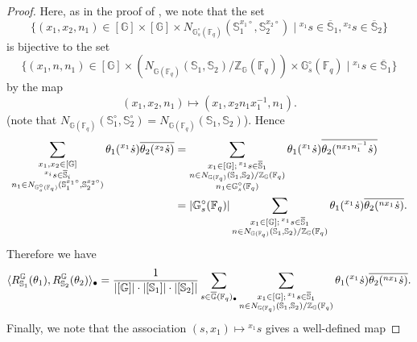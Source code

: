 \documentclass{amsart}
\newcommand{\F}{\mathbb{F}}
\newcommand{\bbS}{\mathbb{S}}
\newcommand{\bbG}{\mathbb{G}}
\newcommand{\bbZ}{\mathbb{Z}}
\theoremstyle{plain}
\theoremstyle{definition}
\theoremstyle{remark}
\theoremstyle{theorem}
\begin{document}
\begin{proof}
Here, as in the proof of \cite[Lemma 6.10]{DL76}, we note that the set 
\[
\{(x_{1},x_{2},n_{1})\in[\bbG]\times[\bbG]\times N_{\bbG_{s}^{\circ}(\F_{q})}(\bbS_{1}^{x_{1}\circ},\bbS_{2}^{x_{2}\circ})
\mid
{}^{x_{1}}s\in\overline{\bbS}_{1}, {}^{x_{2}}s\in\overline{\bbS}_{2}\}
\]
is bijective to the set
\[
\{(x_{1},n,n_{1})\in [\bbG]\times (N_{\bbG(\F_{q})}(\bbS_{1},\bbS_{2})/\bbZ_{\bbG}(\F_{q}))\times\bbG_{s}^{\circ}(\F_{q})
\mid
{}^{x_{1}}s\in\overline{\bbS}_{1}\}
\]
by the map
\[
(x_{1},x_{2},n_{1})\mapsto (x_{1},x_{2}n_{1}x_{1}^{-1},n_{1}).
\]
(note that $N_{\bbG(\F_{q})}(\bbS_{1}^{\circ},\bbS_{2}^{\circ})=N_{\bbG(\F_{q})}(\bbS_{1},\bbS_{2})$).
Hence
\begin{align*}
\sum_{\begin{subarray}{c}x_{1},x_{2}\in[\bbG]\\ {}^{x_{i}}s\in\overline{\bbS}_{i} \\ n_{1}\in N_{\bbG_{s}^{\circ}(\F_{q})}(\bbS_{1}^{x_{1}\circ},\bbS_{2}^{x_{2}\circ})\end{subarray}}
\theta_{1}({}^{x_{1}}\dot{s})\overline{\theta_{2}({}^{x_{2}}\dot{s})}
&=
\sum_{\begin{subarray}{c}x_{1}\in[\bbG];\, {}^{x_{1}}s\in\overline{\bbS}_{1} \\ n\in N_{\bbG(\F_{q})}(\bbS_{1},\bbS_{2})/\bbZ_{\bbG}(\F_{q})\\ n_{1}\in \bbG_{s}^{\circ}(\F_{q})\end{subarray}}
\theta_{1}({}^{x_{1}}\dot{s})\overline{\theta_{2}({}^{nx_{1}n_{1}^{-1}}\dot{s})}\\
&=
|\bbG_{s}^{\circ}(\F_{q})|
\sum_{\begin{subarray}{c}x_{1}\in[\bbG];\, {}^{x_{1}}s\in\overline{\bbS}_{1} \\ n\in N_{\bbG(\F_{q})}(\bbS_{1},\bbS_{2})/\bbZ_{\bbG}(\F_{q})\end{subarray}}
\theta_{1}({}^{x_{1}}\dot{s})\overline{\theta_{2}({}^{nx_{1}}\dot{s})}.
\end{align*}
Therefore we have
\[
\langle R_{\bbS_1}^{\bbG}(\theta_1),R_{\bbS_2}^{\bbG}(\theta_2)\rangle_{\bullet}
=
\frac{1}{|[\bbG]|\cdot|[\bbS_{1}]|\cdot|[\bbS_{2}]|}
\sum_{s\in\overline{\bbG}(\F_{q})_{\bullet}}
\sum_{\begin{subarray}{c}x_{1}\in[\bbG];\, {}^{x_{1}}s\in\overline{\bbS}_{1} \\ n\in N_{\bbG(\F_{q})}(\bbS_{1},\bbS_{2})/\bbZ_{\bbG}(\F_{q})\end{subarray}}
\theta_{1}({}^{x_{1}}\dot{s})\overline{\theta_{2}({}^{nx_{1}}\dot{s})}.
\]
Finally, we note that the association $(s,x_{1})\mapsto {}^{x_{1}}s$ gives a well-defined map

\end{proof}
\end{document}

